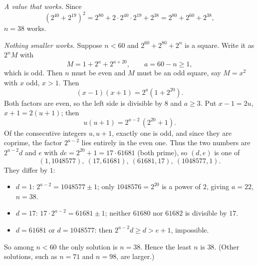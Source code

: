 \emph{A value that works.} Since
\[
(2^{40}+2^{19})^2=2^{80}+2\cdot2^{40}\cdot2^{19}+2^{38}=2^{80}+2^{60}+2^{38},
\]
\(n=38\) works.

\emph{Nothing smaller works.} Suppose \(n<60\) and \(2^{60}+2^{80}+2^n\) is a square. Write it as \(2^n M\) with
\[
M=1+2^{a}+2^{a+20},\qquad a=60-n\ge1,
\]
which is odd. Then \(n\) must be even and \(M\) must be an odd square, say \(M=x^2\) with \(x\) odd, \(x>1\). Then
\[
(x-1)(x+1)=2^a(1+2^{20}).
\]
Both factors are even, so the left side is divisible by \(8\) and \(a\ge3\). Put \(x-1=2u\), \(x+1=2(u+1)\); then
\[
u(u+1)=2^{a-2}\,(2^{20}+1).
\]
Of the consecutive integers \(u,u+1\), exactly one is odd, and since they are coprime, the factor \(2^{a-2}\) lies entirely in the even one. Thus the two numbers are \(2^{a-2}d\) and \(e\) with \(de=2^{20}+1=17\cdot61681\) (both prime), so \((d,e)\) is one of
\[
(1,1048577),\ (17,61681),\ (61681,17),\ (1048577,1).
\]
They differ by \(1\):
\begin{itemize}
\item \(d=1\): \(2^{a-2}=1048577\pm1\); only \(1048576=2^{20}\) is a power of \(2\), giving \(a=22\), \(n=38\).
\item \(d=17\): \(17\cdot2^{a-2}=61681\pm1\); neither \(61680\) nor \(61682\) is divisible by \(17\).
\item \(d=61681\) or \(d=1048577\): then \(2^{a-2}d\ge d>e+1\), impossible.
\end{itemize}
So among \(n<60\) the only solution is \(n=38\). Hence the least \(n\) is \(\boxed{38}\). (Other solutions, such as \(n=71\) and \(n=98\), are larger.)
